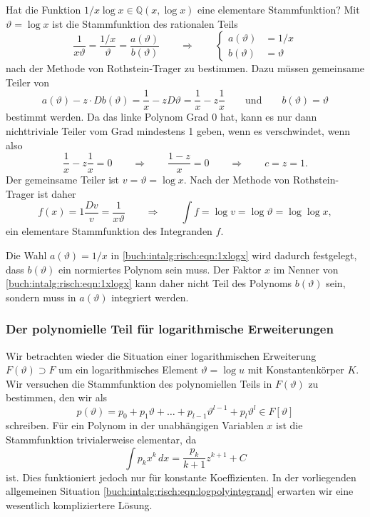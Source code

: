 \begin{beispiel}
Hat die Funktion $1/x\log x \in \mathbb{Q}(x,\log x)$ eine elementare
Stammfunktion?
Mit $\vartheta=\log x$ ist die Stammfunktion des rationalen Teils
\begin{equation}
\frac{1}{x\vartheta}
=
\frac{1/x}{\vartheta}
=
\frac{a(\vartheta)}{b(\vartheta)}
\qquad\Rightarrow\qquad
\begin{cases}
a(\vartheta) &= 1/x\\
b(\vartheta) &= \vartheta
\end{cases}
\label{buch:intalg:risch:eqn:1xlogx}
\end{equation}
nach der Methode von Rothstein-Trager zu bestimmen.
Dazu müssen gemeinsame Teiler von
\[
a(\vartheta) - z\cdot Db(\vartheta)
=
\frac{1}{x} - zD\vartheta
=
\frac{1}{x} - z\frac{1}{x}
\qquad\text{und}\qquad
b(\vartheta)=\vartheta
\]
bestimmt werden.
Da das linke Polynom Grad 0 hat, kann es nur dann nichttriviale
Teiler vom Grad mindestens 1 geben, wenn es verschwindet, wenn also
\[
\frac{1}{x} - z\frac{1}{x}
=
0
\qquad\Rightarrow\qquad
\frac{1-z}{x}
=
0
\qquad\Rightarrow\qquad
c=z=1.
\]
Der gemeinsame Teiler ist $v=\vartheta=\log x$.
Nach der Methode von Rothstein-Trager ist daher
\[
f(x)
=
1\frac{Dv}{v}
=
\frac{1}{x \vartheta}
\qquad\Rightarrow\qquad
\int f
=
\log v
=
\log \vartheta
=
\log\log x,
\]
ein elementare Stammfunktion des Integranden $f$.

Die Wahl $a(\vartheta)=1/x$ in \eqref{buch:intalg:risch:eqn:1xlogx}
wird dadurch festgelegt, dass $b(\vartheta)$ ein normiertes Polynom
sein muss.
Der Faktor $x$ im Nenner von \eqref{buch:intalg:risch:eqn:1xlogx}
kann daher nicht Teil des Polynoms $b(\vartheta)$ sein, sondern muss
in $a(\vartheta)$ integriert werden.
\end{beispiel}

%
%
\subsubsection{Der polynomielle Teil für logarithmische Erweiterungen}
Wir betrachten wieder die Situation einer logarithmischen Erweiterung
$F(\vartheta)\supset F$ um ein logarithmisches Element $\vartheta =\log u$
mit Konstantenkörper $K$.
Wir versuchen die Stammfunktion des polynomiellen Teils in $F(\vartheta)$
zu bestimmen, den wir als
\begin{equation}
p(\vartheta)
=
p_0 + p_1\vartheta + \dots + p_{l-1}\vartheta^{l-1} + p_l\vartheta^l
\in
F[\vartheta]
\label{buch:intalg:risch:eqn:logpolyintegrand}
\end{equation}
schreiben.
Für ein Polynom in der unabhängigen Variablen $x$ ist die Stammfunktion
trivialerweise elementar, da 
\[
\int p_kx^k \,dx = \frac{p_k}{k+1}z^{k+1} + C
\]
ist.
Dies funktioniert jedoch nur für konstante Koeffizienten.
In der vorliegenden allgemeinen Situation
\eqref{buch:intalg:risch:eqn:logpolyintegrand}
erwarten wir eine wesentlich kompliziertere Lösung.

